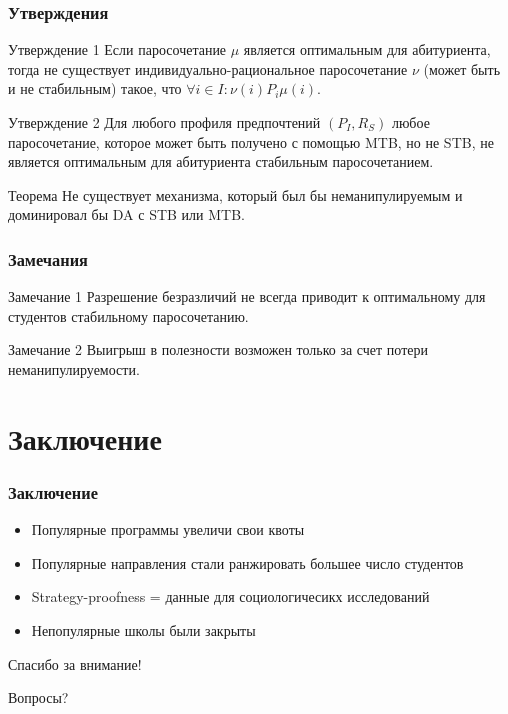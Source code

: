 \documentclass[10pt,pdf,hyperref={unicode}]{beamer}
\begin{document}
\begin{frame}
    \frametitle{Утверждения}
    \begin{block}{Утверждение 1}
        Если паросочетание $\mu$ является оптимальным для абитуриента, тогда не существует индивидуально-рациональное паросочетание $\nu$ (может быть и не стабильным) такое, что $\forall i \in I: \nu(i) P_i \mu(i)$.
    \end{block}

    \begin{block}{Утверждение 2}
        Для любого профиля предпочтений $(P_I, R_S)$ любое паросочетание, которое может быть получено с помощью MTB, но не STB, не является оптимальным для абитуриента стабильным паросочетанием.
    \end{block}

    \begin{block}{Теорема}
        Не существует механизма, который был бы неманипулируемым и доминировал бы DA с STB или MTB.
    \end{block}
\end{frame}

\begin{frame}
    \frametitle{Замечания}
    \begin{block}{Замечание 1}
        Разрешение безразличий не всегда приводит к оптимальному для студентов стабильному паросочетанию.
    \end{block}

    \begin{block}{Замечание 2}
        Выигрыш в полезности возможен только за счет потери неманипулируемости.
    \end{block}
\end{frame}

\section{Заключение}

\begin{frame}
    \frametitle{Заключение}
    \begin{block}{ }
        \begin{itemize}
            \item Популярные программы увеличи свои квоты
            \item Популярные направления стали ранжировать большее число студентов
            \item Strategy-proofness = данные для социологичесикх исследований
            \item Непопулярные школы были закрыты
        \end{itemize}
    \end{block}
\end{frame}

\begin{frame}
    \begin{center}
        {\Large Спасибо за внимание!}
    \end{center}

    \begin{center}
        {\Large Вопросы?}
    \end{center}
\end{frame}
\end{document}
